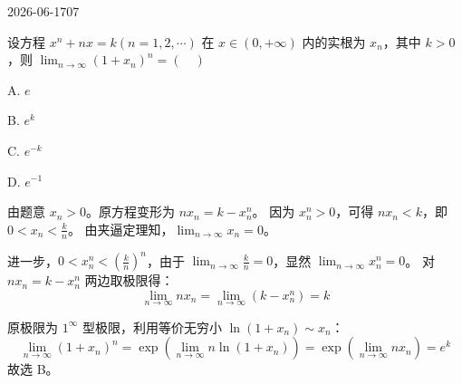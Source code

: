\begin{mistake}{2026-06-17}{07}

\begin{problemcontent}
设方程 \(x^n + nx = k(n = 1,2,\cdots)\) 在 \(x \in (0, +\infty)\) 内的实根为 \(x_n\)，其中 \(k > 0\)，则 \(\lim_{n\to\infty}(1+x_n)^n = (\quad)\)

A. \(e\)

B. \(e^k\)

C. \(e^{-k}\)

D. \(e^{-1}\)
\end{problemcontent}

\begin{solutioncontent}
由题意 \(x_n > 0\)。原方程变形为 \(nx_n = k - x_n^n\)。
因为 \(x_n^n > 0\)，可得 \(nx_n < k\)，即 \(0 < x_n < \frac{k}{n}\)。
由夹逼定理知，\(\lim_{n\to\infty} x_n = 0\)。

进一步，\(0 < x_n^n < \left(\frac{k}{n}\right)^n\)，由于 \(\lim_{n\to\infty} \frac{k}{n} = 0\)，显然 \(\lim_{n\to\infty} x_n^n = 0\)。
对 \(nx_n = k - x_n^n\) 两边取极限得：
\[
\lim_{n\to\infty} n x_n = \lim_{n\to\infty} (k - x_n^n) = k
\]

原极限为 \(1^\infty\) 型极限，利用等价无穷小 \(\ln(1+x_n) \sim x_n\)：
\[
\lim_{n\to\infty} (1+x_n)^n = \exp\left( \lim_{n\to\infty} n \ln(1+x_n) \right) = \exp\left( \lim_{n\to\infty} n x_n \right) = e^k
\]
故选 B。
\end{solutioncontent}


\end{mistake}
